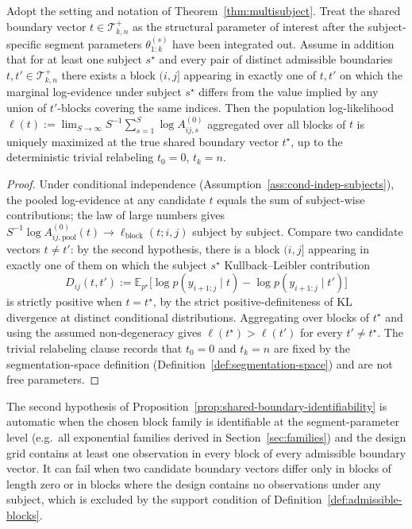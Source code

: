 \begin{proposition}
\label{prop:shared-boundary-identifiability}
Adopt the setting and notation of Theorem~\ref{thm:multisubject}. Treat the shared boundary vector
$t\in\mathcal{T}_{k,n}^{+}$ as the structural parameter of interest after the subject-specific
segment parameters $\theta^{(s)}_{1:k}$ have been integrated out. Assume in addition that for at
least one subject $s^\star$ and every pair of distinct admissible boundaries
$t,t'\in\mathcal{T}_{k,n}^{+}$ there exists a block $(i,j]$ appearing in exactly one of $t,t'$ on
which the marginal log-evidence under subject $s^\star$ differs from the value implied by any
union of $t'$-blocks covering the same indices. Then the population log-likelihood
$\ell(t):=\lim_{S\to\infty}S^{-1}\sum_{s=1}^S\log A^{(0)}_{ij,s}$ aggregated over all blocks of $t$
is uniquely maximized at the true shared boundary vector $t^\star$, up to the deterministic
trivial relabeling $t_0=0$, $t_k=n$.
\end{proposition}

\begin{proof}
Under conditional independence (Assumption~\ref{ass:cond-indep-subjects}), the pooled
log-evidence at any candidate $t$ equals the sum of subject-wise contributions; the law of large
numbers gives $S^{-1}\log A^{(0)}_{ij,\mathrm{pool}}(t)\to \ell_{\mathrm{block}}(t;i,j)$ subject by
subject. Compare two candidate vectors $t\neq t'$: by the second hypothesis, there is a block
$(i,j]$ appearing in exactly one of them on which the subject $s^\star$ Kullback--Leibler
contribution
\[
D_{ij}(t,t')
 :=\mathbb{E}_{p^\star}\bigl[\log p(y_{i+1:j}\mid t)-\log p(y_{i+1:j}\mid t')\bigr]
\]
is strictly positive when $t=t^\star$, by the strict positive-definiteness of KL divergence at
distinct conditional distributions. Aggregating over blocks of $t^\star$ and using the assumed
non-degeneracy gives $\ell(t^\star)>\ell(t')$ for every $t'\ne t^\star$. The trivial relabeling
clause records that $t_0=0$ and $t_k=n$ are fixed by the segmentation-space definition
(Definition~\ref{def:segmentation-space}) and are not free parameters.
\end{proof}

\begin{remark}
\label{rem:identifying-block}
The second hypothesis of Proposition~\ref{prop:shared-boundary-identifiability} is automatic when
the chosen block family is identifiable at the segment-parameter level (e.g.\ all exponential
families derived in Section~\ref{sec:families}) and the design grid contains at least one
observation in every block of every admissible boundary vector. It can fail when two candidate
boundary vectors differ only in blocks of length zero or in blocks where the design contains no
observations under any subject, which is excluded by the support condition of
Definition~\ref{def:admissible-blocks}.
\end{remark}

